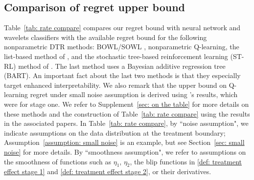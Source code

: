 \documentclass[preprint] {imsart}
\begin{document}
  \subsection*{Comparison of regret upper bound} 
Table~\ref{tab: rate compare} compares our regret bound with neural network and wavelets classifiers with the available regret bound for the following nonparametric DTR methods: BOWL/SOWL \citep{zhao2015}, nonparametric Q-learning, the list-based method of \cite{zhang2018interpretable}, and the stochastic tree-based reinforcement learning (ST-RL) method of \cite{sun2021stochastic}. The last method uses a Bayesian additive regression tree (BART). An important fact about the last two methods is that they especially target enhanced interpretability. We also remark that the upper bound on Q-learning regret under small noise assumption is derived using \cite{qian2011}'s results, which were for stage one.
We refer to Supplement~\ref{sec: on the table} for more  details on these methods and the construction of Table~\ref{tab: rate compare} using the results in the associated papers. In Table~\ref{tab: rate compare}, by ``noise assumption", we indicate assumptions on the data distribution at the treatment boundary; Assumption~\ref{assumption: small noise} is an example, but see  Section~\ref{sec: small noise} for more details. By ``smoothness assumption", we refer to assumptions on the smoothness of functions such as $\eta_1$, $\eta_2$,  the blip functions in \eqref{def: treatment effect stage 1} and \eqref{def: treatment effect stage 2}, or their derivatives.
\end{document}
